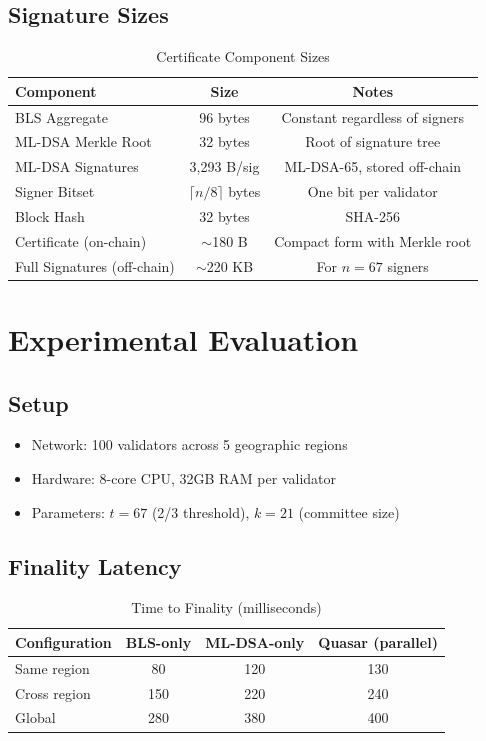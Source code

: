 \documentclass[11pt,a4paper]{article}
\begin{document}
\subsection{Signature Sizes}

\begin{table}[h]
\centering
\caption{Certificate Component Sizes}
\begin{tabular}{@{}lcc@{}}
\toprule
Component & Size & Notes \\
\midrule
BLS Aggregate & 96 bytes & Constant regardless of signers \\
ML-DSA Merkle Root & 32 bytes & Root of signature tree \\
ML-DSA Signatures & 3,293 B/sig & ML-DSA-65, stored off-chain \\
Signer Bitset & $\lceil n/8 \rceil$ bytes & One bit per validator \\
Block Hash & 32 bytes & SHA-256 \\
\midrule
Certificate (on-chain) & $\sim$180 B & Compact form with Merkle root \\
Full Signatures (off-chain) & $\sim$220 KB & For $n = 67$ signers \\
\bottomrule
\end{tabular}
\end{table}

\section{Experimental Evaluation}

\subsection{Setup}

\begin{itemize}
    \item Network: 100 validators across 5 geographic regions
    \item Hardware: 8-core CPU, 32GB RAM per validator
    \item Parameters: $t = 67$ (2/3 threshold), $k = 21$ (committee size)
\end{itemize}

\subsection{Finality Latency}

\begin{table}[h]
\centering
\caption{Time to Finality (milliseconds)}
\begin{tabular}{@{}lccc@{}}
\toprule
Configuration & BLS-only & ML-DSA-only & Quasar (parallel) \\
\midrule
Same region & 80 & 120 & 130 \\
Cross region & 150 & 220 & 240 \\
Global & 280 & 380 & 400 \\
\bottomrule
\end{tabular}
\end{table}
\end{document}
